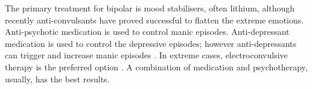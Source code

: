 The primary treatment for bipolar is mood stabilisers, often lithium, although recently anti-convulsants have proved successful to flatten the extreme emotions. Anti-psychotic medication is used to control manic episodes. Anti-depressant medication is used to control the depressive episodes; however anti-depressants can trigger and increase manic episodes . In extreme cases, electroconvulsive therapy is the preferred option \citep{dierckx_efficacy_2012}. A combination of medication and psychotherapy, usually, has the best results.